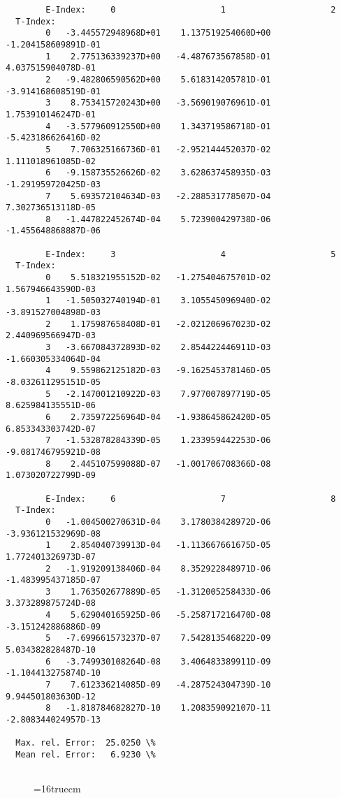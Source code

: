 \documentclass[12pt,dvipdfmx]{article}
\begin{document}
{\begin{small}
\begin{verbatim}
        E-Index:     0                     1                     2
  T-Index:
        0   -3.445572948968D+01    1.137519254060D+00   -1.204158609891D-01
        1    2.775136339237D+00   -4.487673567858D-01    4.037515904078D-01
        2   -9.482806590562D+00    5.618314205781D-01   -3.914168608519D-01
        3    8.753415720243D+00   -3.569019076961D-01    1.753910146247D-01
        4   -3.577960912550D+00    1.343719586718D-01   -5.423186626416D-02
        5    7.706325166736D-01   -2.952144452037D-02    1.111018961085D-02
        6   -9.158735526626D-02    3.628637458935D-03   -1.291959720425D-03
        7    5.693572104634D-03   -2.288531778507D-04    7.302736513118D-05
        8   -1.447822452674D-04    5.723900429738D-06   -1.455648868887D-06

        E-Index:     3                     4                     5
  T-Index:
        0    5.518321955152D-02   -1.275404675701D-02    1.567946643590D-03
        1   -1.505032740194D-01    3.105545096940D-02   -3.891527004898D-03
        2    1.175987658408D-01   -2.021206967023D-02    2.440969566947D-03
        3   -3.667084372893D-02    2.854422446911D-03   -1.660305334064D-04
        4    9.559862125182D-03   -9.162545378146D-05   -8.032611295151D-05
        5   -2.147001210922D-03    7.977007897719D-05    8.625984135551D-06
        6    2.735972256964D-04   -1.938645862420D-05    6.853343303742D-07
        7   -1.532878284339D-05    1.233959442253D-06   -9.081746795921D-08
        8    2.445107599088D-07   -1.001706708366D-08    1.073020722799D-09

        E-Index:     6                     7                     8
  T-Index:
        0   -1.004500270631D-04    3.178038428972D-06   -3.936121532969D-08
        1    2.854040739913D-04   -1.113667661675D-05    1.772401326973D-07
        2   -1.919209138406D-04    8.352922848971D-06   -1.483995437185D-07
        3    1.763502677889D-05   -1.312005258433D-06    3.373289875724D-08
        4    5.629040165925D-06   -5.258717216470D-08   -3.151242886886D-09
        5   -7.699661573237D-07    7.542813546822D-09    5.034382828487D-10
        6   -3.749930108264D-08    3.406483389911D-09   -1.104413275874D-10
        7    7.612336214085D-09   -4.287524304739D-10    9.944501803630D-12
        8   -1.818784682827D-10    1.208359092107D-11   -2.808344024957D-13

  Max. rel. Error:  25.0250 \%
  Mean rel. Error:   6.9230 \%


\end{verbatim}\end{small}
\begin{figure} \label{2.3.2c}
\epsfxsize=16truecm
\end{figure}
\newpage


}
\end{document}
